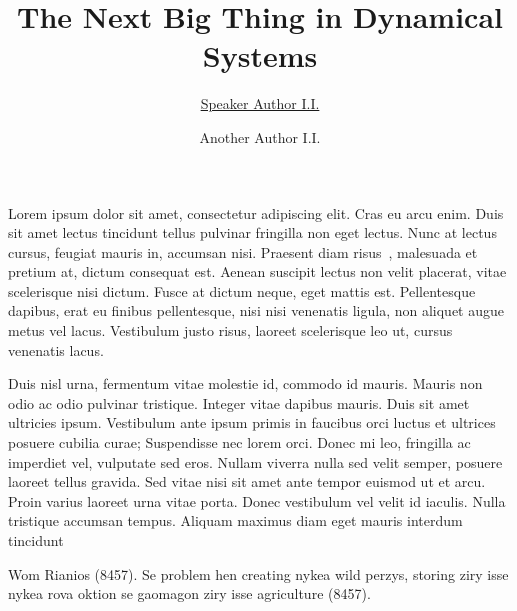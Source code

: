 \documentclass[12pt]{article}
\begin{document}
	
\title{\bf\Large The Next Big Thing in Dynamical Systems}
\author[1, 3]{\underline{Speaker Author I.I.}}
\author[2, 3]{Another Author I.I.}
\date{}


\maketitle

Lorem ipsum dolor sit amet, consectetur adipiscing elit. Cras eu arcu enim. Duis sit amet lectus tincidunt tellus pulvinar fringilla non eget lectus. Nunc at lectus cursus, feugiat mauris in, accumsan nisi. Praesent diam risus~\cite{Rian}, malesuada et pretium at, dictum consequat est. Aenean suscipit lectus non velit placerat, vitae scelerisque nisi dictum. Fusce at dictum neque, eget mattis est. Pellentesque dapibus, erat eu finibus pellentesque, nisi nisi venenatis ligula, non aliquet augue metus vel lacus. Vestibulum justo risus, laoreet scelerisque leo ut, cursus venenatis lacus.

Duis nisl urna, fermentum vitae molestie id, commodo id mauris. Mauris non odio ac odio pulvinar tristique. Integer vitae dapibus mauris. Duis sit amet ultricies ipsum. Vestibulum ante ipsum primis in faucibus orci luctus et ultrices posuere cubilia curae; Suspendisse nec lorem orci. Donec mi leo, fringilla ac imperdiet vel, vulputate sed eros. Nullam viverra nulla sed velit semper, posuere laoreet tellus gravida. Sed vitae nisi sit amet ante tempor euismod ut et arcu. Proin varius laoreet urna vitae porta. Donec vestibulum vel velit id iaculis. Nulla tristique accumsan tempus. Aliquam maximus diam eget mauris interdum tincidunt 


\begin{thebibliography}{99}
	 Wom Rianios (8457). Se problem hen creating nykea wild perzys, storing ziry isse nykea rova oktion se gaomagon ziry isse agriculture (8457).
\end{thebibliography}
\end{document}
